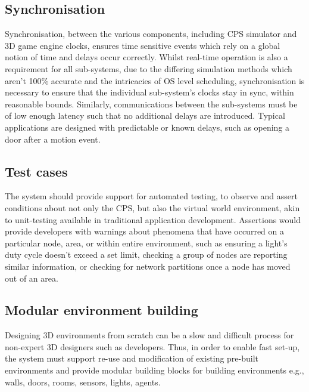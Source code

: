\subsection{Synchronisation}
\label{sub:requirements_synchronisation}
Synchronisation, between the various components, including CPS simulator and 3D game engine clocks, ensures time sensitive events which rely on a global notion of time and delays occur correctly. Whilst real-time operation is also a requirement for all sub-systems, due to the differing simulation methods which aren't 100\% accurate and the intricacies of OS level scheduling, synchronisation is necessary to ensure that the individual sub-system's clocks stay in sync, within reasonable bounds. Similarly, communications between the sub-systems must be of low enough latency such that no additional delays are introduced. Typical applications are designed with predictable or known delays, such as opening a door after a motion event.

\subsection{Test cases}
\label{sub:requirements_test_cases} 
The system should provide support for automated testing, to observe and assert conditions about not only the CPS, but also the virtual world environment, akin to unit-testing available in traditional application development. Assertions would provide developers with warnings about phenomena that have occurred on a particular node, area, or within entire environment, such as ensuring a light's duty cycle doesn't exceed a set limit, checking a group of nodes are reporting similar information, or checking for network partitions once a node has moved out of an area.


\subsection{Modular environment building}
\label{sub:requirements_modular_building}
Designing 3D environments from scratch can be a slow and difficult process for non-expert 3D designers such as developers. Thus, in order to enable fast set-up, the system must support re-use and modification of existing pre-built environments and provide modular building blocks for building environments e.g., walls, doors, rooms, sensors, lights, agents.


